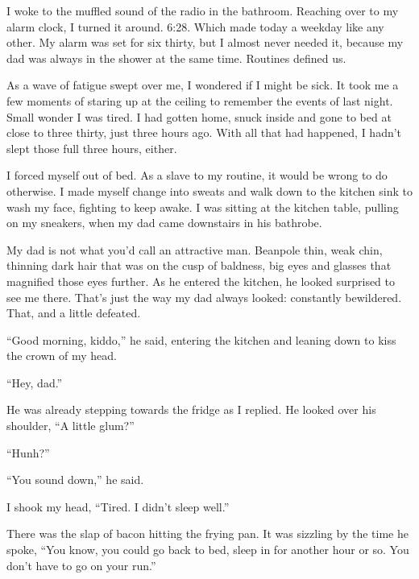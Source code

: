 





I woke to the muffled sound of the radio in the bathroom.  Reaching over to my alarm clock, I turned it around.  6:28.  Which made today a weekday like any other.  My alarm was set for six thirty, but I almost never needed it, because my dad was always in the shower at the same time.  Routines defined us.



As a wave of fatigue swept over me, I wondered if I might be sick.  It took me a few moments of staring up at the ceiling to remember the events of last night.  Small wonder I was tired.  I had gotten home, snuck inside and gone to bed at close to three thirty, just three hours ago.  With all that had happened, I hadn't slept those full three hours, either.



I forced myself out of bed.  As a slave to my routine, it would be wrong to do otherwise.  I made myself change into sweats and walk down to the kitchen sink to wash my face, fighting to keep awake.  I was sitting at the kitchen table, pulling on my sneakers, when my dad came downstairs in his bathrobe.



My dad is not what you'd call an attractive man.  Beanpole thin, weak chin, thinning dark hair that was on the cusp of baldness, big eyes and glasses that magnified those eyes further.  As he entered the kitchen, he looked surprised to see me there.  That's just the way my dad always looked: constantly bewildered.  That, and a little defeated.



``Good morning, kiddo,'' he said, entering the kitchen and leaning down to kiss the crown of my head.



``Hey, dad.''



He was already stepping towards the fridge as I replied.  He looked over his shoulder, ``A little glum?''



``Hunh?''



``You sound down,'' he said.



I shook my head, ``Tired.  I didn't sleep well.''



There was the slap of bacon hitting the frying pan.  It was sizzling by the time he spoke, ``You know, you could go back to bed, sleep in for another hour or so.  You don't have to go on your run.''



